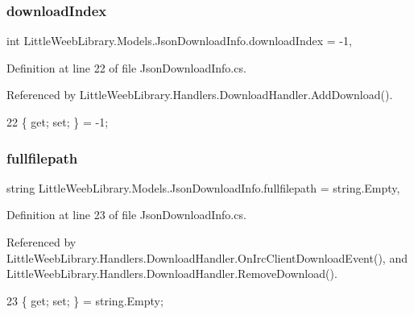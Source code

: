 \subsubsection{\texorpdfstring{download\+Index}{downloadIndex}}
{\footnotesize\ttfamily int Little\+Weeb\+Library.\+Models.\+Json\+Download\+Info.\+download\+Index = -\/1\hspace{0.3cm}{\ttfamily [get]}, {\ttfamily [set]}}



Definition at line 22 of file Json\+Download\+Info.\+cs.



Referenced by Little\+Weeb\+Library.\+Handlers.\+Download\+Handler.\+Add\+Download().


\begin{DoxyCode}
22 \{ \textcolor{keyword}{get}; \textcolor{keyword}{set}; \} = -1;
\end{DoxyCode}
\mbox{\label{class_little_weeb_library_1_1_models_1_1_json_download_info_a67b4d374c16d8ed97f39438c10196861}} 
\subsubsection{\texorpdfstring{fullfilepath}{fullfilepath}}
{\footnotesize\ttfamily string Little\+Weeb\+Library.\+Models.\+Json\+Download\+Info.\+fullfilepath = string.\+Empty\hspace{0.3cm}{\ttfamily [get]}, {\ttfamily [set]}}



Definition at line 23 of file Json\+Download\+Info.\+cs.



Referenced by Little\+Weeb\+Library.\+Handlers.\+Download\+Handler.\+On\+Irc\+Client\+Download\+Event(), and Little\+Weeb\+Library.\+Handlers.\+Download\+Handler.\+Remove\+Download().


\begin{DoxyCode}
23 \{ \textcolor{keyword}{get}; \textcolor{keyword}{set}; \} = \textcolor{keywordtype}{string}.Empty;
\end{DoxyCode}
\mbox{\label{class_little_weeb_library_1_1_models_1_1_json_download_info_af04b1b815de21ea578f039ecc0e2957b}} 
